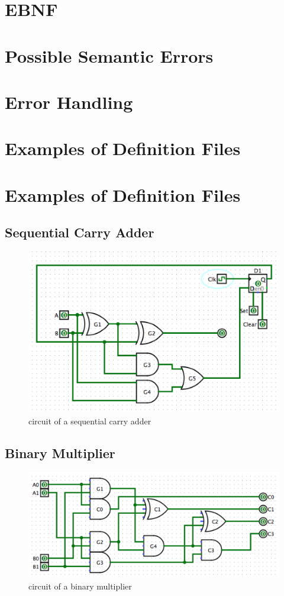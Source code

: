 \documentclass[12pt]{article}
\begin{document}
\section{EBNF}
\section{Possible Semantic Errors}
\section{Error Handling}
\section{Examples of Definition Files}

\section{Examples of Definition Files}
\subsection{Sequential Carry Adder}
\begin{figure}[h]
    \centering
    \includegraphics{sequential_carry_adder.png}
    \caption{circuit of a sequential carry adder}
\end{figure}



\subsection{Binary Multiplier}
\begin{figure}[h]
    \centering
    \includegraphics{bin_multiplier.png}
    \caption{circuit of a binary multiplier}
\end{figure}

\end{document}

